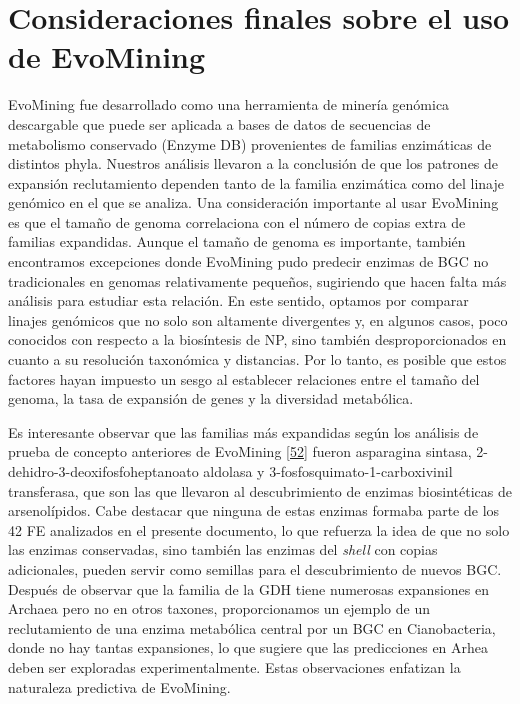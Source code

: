 \documentclass[12pt,twoside]{reedthesis}
\begin{document}
  \section{Consideraciones finales sobre el uso de
  EvoMining}\label{consideraciones-finales-sobre-el-uso-de-evomining}
  
  EvoMining fue desarrollado como una herramienta de minería genómica
  descargable que puede ser aplicada a bases de datos de secuencias de
  metabolismo conservado (Enzyme DB) provenientes de familias enzimáticas
  de distintos phyla. Nuestros análisis llevaron a la conclusión de que
  los patrones de expansión reclutamiento dependen tanto de la familia
  enzimática como del linaje genómico en el que se analiza. Una
  consideración importante al usar EvoMining es que el tamaño de genoma
  correlaciona con el número de copias extra de familias expandidas.
  Aunque el tamaño de genoma es importante, también encontramos
  excepciones donde EvoMining pudo predecir enzimas de BGC no
  tradicionales en genomas relativamente pequeños, sugiriendo que hacen
  falta más análisis para estudiar esta relación. En este sentido, optamos
  por comparar linajes genómicos que no solo son altamente divergentes y,
  en algunos casos, poco conocidos con respecto a la biosíntesis de NP,
  sino también desproporcionados en cuanto a su resolución taxonómica y
  distancias. Por lo tanto, es posible que estos factores hayan impuesto
  un sesgo al establecer relaciones entre el tamaño del genoma, la tasa de
  expansión de genes y la diversidad metabólica.
  
  Es interesante observar que las familias más expandidas según los
  análisis de prueba de concepto anteriores de EvoMining
  {[}\protect\hyperlink{ref-cruz-morales_phylogenomic_2016}{52}{]} fueron
  asparagina sintasa, 2-dehidro-3-deoxifosfoheptanoato aldolasa y
  3-fosfosquimato-1-carboxivinil transferasa, que son las que llevaron al
  descubrimiento de enzimas biosintéticas de arsenolípidos. Cabe destacar
  que ninguna de estas enzimas formaba parte de los 42 FE analizados en el
  presente documento, lo que refuerza la idea de que no solo las enzimas
  conservadas, sino también las enzimas del \emph{shell} con copias
  adicionales, pueden servir como semillas para el descubrimiento de
  nuevos BGC. Después de observar que la familia de la GDH tiene numerosas
  expansiones en Archaea pero no en otros taxones, proporcionamos un
  ejemplo de un reclutamiento de una enzima metabólica central por un BGC
  en Cianobacteria, donde no hay tantas expansiones, lo que sugiere que
  las predicciones en Arhea deben ser exploradas experimentalmente. Estas
  observaciones enfatizan la naturaleza predictiva de EvoMining.
  
\end{document}
